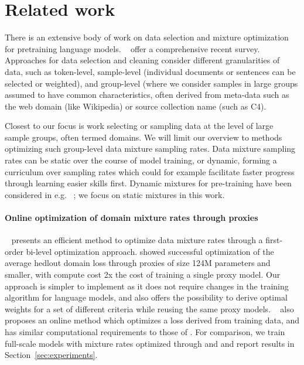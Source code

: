 
\section{Related work}
\label{sec:related}
There is an extensive body of work on data selection and mixture optimization for pretraining language models. ~\citet{albalak2024surveydataselectionlanguage} offer a comprehensive recent survey. Approaches for data selection and cleaning consider different granularities of data, such as token-level, sample-level (individual documents or sentences can be selected or weighted), and group-level (where we consider samples in large groups assumed to have common characteristics, often derived from meta-data such as the web domain (like Wikipedia) or source collection name (such as C4).

Closest to our focus is work selecting or sampling data at the level of large sample groups, often termed domains. We will limit our overview to methods optimizing such group-level data mixture sampling rates. Data mixture sampling rates can be static over the course of model training, or dynamic, forming a curriculum over sampling rates which could for example facilitate faster progress through learning easier skills first. Dynamic mixtures for pre-training have been considered in e.g. ~\cite{albalak2023efficientonlinedatamixing,anelia_mix}; we focus on static mixtures in this work.





\paragraph{Online optimization of domain mixture rates through proxies}
{\doge}~\cite{DOGE} presents an efficient method to optimize data mixture rates through a first-order bi-level optimization approach.  {\doge} showed successful optimization of the average hedlout domain loss through proxies of size 124M parameters and smaller, with compute cost 2x the cost of training a single proxy model. Our approach is simpler to implement as it does not require changes in the training algorithm for language models, and also offers the possibility to derive optimal weights for a set of different criteria while reusing the same proxy models. {\doremi}~\cite{doremi} also proposes an online method which optimizes a loss derived from training data, and has similar computational requirements to those of {\doge}.  For comparison, we train full-scale models with mixture rates optimized through {\doge} and {\doremi} and report results in Section~\ref{sec:experiments}.



